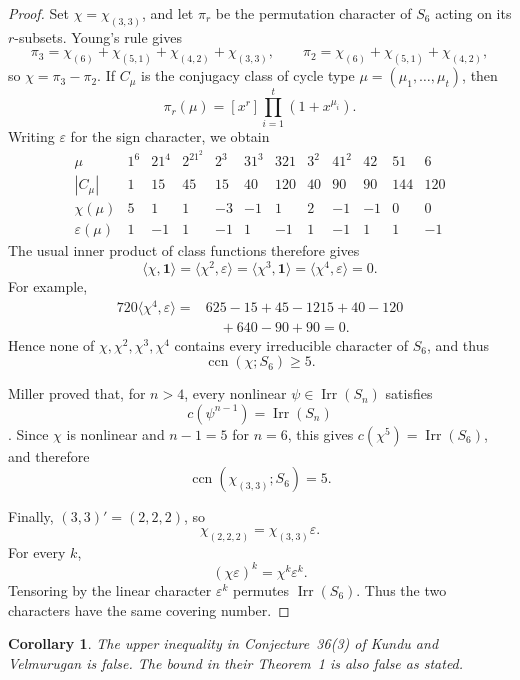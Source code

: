 \documentclass[11pt]{amsart}
\newtheorem{corollary}[theorem]{Corollary}
\theoremstyle{remark}
\newcommand{\Irr}{\operatorname{Irr}}
\newcommand{\ccn}{\operatorname{ccn}}
\newcommand{\one}{\mathbf{1}}
\begin{document}
\begin{proof}
Set \(\chi=\chi_{(3,3)}\), and let \(\pi_r\) be the permutation
character of \(S_6\) acting on its \(r\)-subsets. Young's rule gives
\[
  \pi_3
  =
  \chi_{(6)}+\chi_{(5,1)}+\chi_{(4,2)}+\chi_{(3,3)},
  \qquad
  \pi_2
  =
  \chi_{(6)}+\chi_{(5,1)}+\chi_{(4,2)},
\]
so \(\chi=\pi_3-\pi_2\). If \(C_\mu\) is the conjugacy class of cycle
type \(\mu=(\mu_1,\ldots,\mu_t)\), then
\[
  \pi_r(\mu)
  =
  [x^r]\prod_{i=1}^t(1+x^{\mu_i}).
\]
Writing \(\varepsilon\) for the sign character, we obtain
\[
\begin{array}{c|rrrrrrrrrrr}
\mu
 &1^6&21^4&2^21^2&2^3&31^3&321&3^2&41^2&42&51&6\\ \hline
|C_\mu|
 &1&15&45&15&40&120&40&90&90&144&120\\
\chi(\mu)
 &5&1&1&-3&-1&1&2&-1&-1&0&0\\
\varepsilon(\mu)
 &1&-1&1&-1&1&-1&1&-1&1&1&-1
\end{array}
\]
The usual inner product of class functions therefore gives
\[
  \langle\chi,\one\rangle
  =
  \langle\chi^2,\varepsilon\rangle
  =
  \langle\chi^3,\one\rangle
  =
  \langle\chi^4,\varepsilon\rangle
  =0.
\]
For example,
\[
\begin{aligned}
720\langle\chi^4,\varepsilon\rangle
={}&625-15+45-1215+40-120\\
   &\quad+640-90+90
 =0.
\end{aligned}
\]
Hence none of \(\chi,\chi^2,\chi^3,\chi^4\) contains every irreducible
character of \(S_6\), and thus
\[
  \ccn(\chi;S_6)\geq5.
\]

Miller proved that, for \(n>4\), every nonlinear
\(\psi\in\Irr(S_n)\) satisfies
\[
  c(\psi^{n-1})=\Irr(S_n)
\]
\cite[Theorem~1.1(i)]{Miller}. Since \(\chi\) is nonlinear and
\(n-1=5\) for \(n=6\), this gives
\(c(\chi^5)=\Irr(S_6)\), and therefore
\[
  \ccn(\chi_{(3,3)};S_6)=5.
\]

Finally, \((3,3)'=(2,2,2)\), so
\[
  \chi_{(2,2,2)}=\chi_{(3,3)}\varepsilon.
\]
For every \(k\),
\[
  (\chi\varepsilon)^k=\chi^k\varepsilon^k.
\]
Tensoring by the linear character \(\varepsilon^k\) permutes
\(\Irr(S_6)\). Thus the two characters have the same covering number.
\end{proof}

\begin{corollary}\label{cor:consequences}
The upper inequality in Conjecture~36(3) of Kundu and Velmurugan
\cite{KV} is false. The bound in their Theorem~1 is also false as
stated.
\end{corollary}
\end{document}
